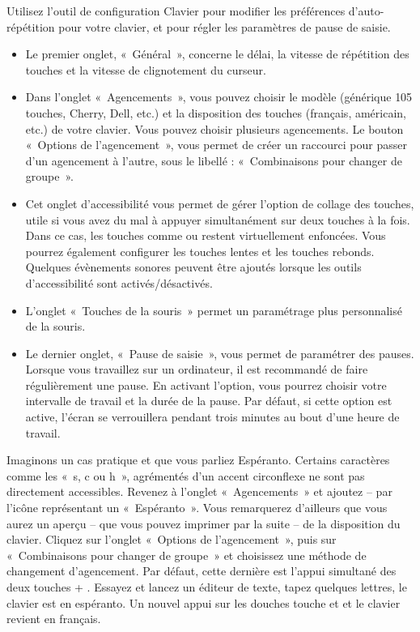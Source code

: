 Utilisez l'outil de configuration Clavier pour modifier les préférences d'auto-répétition pour votre clavier, et pour régler les paramètres de pause de saisie.
\begin{itemize}
\item Le premier onglet, «~Général~», concerne le délai, la vitesse de répétition des touches et la vitesse de clignotement du curseur.
\item Dans l'onglet «~Agencements~», vous pouvez choisir le modèle (générique 105 touches, Cherry, Dell, etc.) et la disposition des touches (français, américain, etc.) de votre clavier. Vous pouvez choisir plusieurs agencements. Le bouton «~Options de l'agencement~», vous permet de créer un raccourci pour passer d'un agencement à l'autre, sous le libellé : «~Combinaisons pour changer de groupe~».
\item Cet onglet d'accessibilité vous permet de gérer l'option de collage des touches, utile si vous avez du mal à appuyer simultanément sur deux touches à la fois. Dans ce cas, les touches comme  ou  restent virtuellement enfoncées. Vous pourrez également configurer les touches lentes et les touches rebonds. Quelques évènements sonores peuvent être ajoutés lorsque les outils d'accessibilité sont activés/désactivés.
\item L'onglet «~Touches de la souris~» permet un paramétrage plus personnalisé de la souris. 
\item Le dernier onglet, «~Pause de saisie~», vous permet de paramétrer des pauses. Lorsque vous travaillez sur un ordinateur, il est recommandé de faire régulièrement une pause. En activant l'option, vous pourrez choisir votre intervalle de travail et la durée de la pause. Par défaut, si cette option est active, l'écran se verrouillera pendant trois minutes au bout d'une heure de travail.
\end{itemize}\par
Imaginons un cas pratique et que vous parliez Espéranto. Certains caractères comme les «~s, c ou h~», agrémentés d'un accent circonflexe ne sont pas directement accessibles. Revenez à l'onglet «~Agencements~» et ajoutez -- par l'icône représentant un \Touche{+} «~Espéranto~». Vous remarquerez d'ailleurs que vous aurez un aperçu -- que vous pouvez imprimer par la suite -- de la disposition du clavier. Cliquez sur l'onglet «~Options de l'agencement~», puis sur «~Combinaisons pour changer de groupe~» et choisissez une méthode de changement d'agencement. Par défaut, cette dernière est l'appui simultané des deux touches  + . Essayez et lancez un éditeur de texte, tapez quelques lettres, le clavier est en espéranto. Un nouvel appui sur les douches touche  et  et le clavier revient en français.

